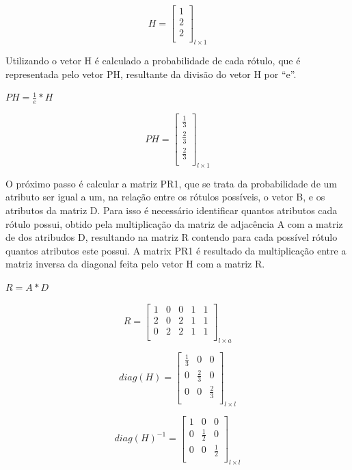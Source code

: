 $$H=\left[
\begin{array}{c}
1 \\
2 \\
2 \\
\end{array}
\right]_{l \times 1}$$

Utilizando o vetor H é calculado a probabilidade de cada rótulo, que é representada
pelo vetor PH, resultante da divisão do vetor H por ``e''.

\begin{center}
$PH= \frac{1}{e} * H$
\end{center}

$$PH=\left[
\begin{array}{c}
\frac{1}{3} \\
\frac{2}{3} \\
\frac{2}{3} \\
\end{array}
\right]_{l \times 1}$$

O próximo passo é calcular a matriz PR1, que se trata da probabilidade de um
atributo ser igual a um, na relação entre os rótulos possíveis, o vetor B, e os
atributos da matriz D. Para isso é necessário identificar quantos atributos cada
rótulo possui, obtido pela multiplicação da matriz de adjacência A com a matriz
de dos atribudos D, resultando na matriz R contendo para cada possível rótulo
quantos atributos este possui. A matrix PR1 é resultado da multiplicação entre a
matriz inversa da diagonal feita pelo vetor H com a matriz R.

\begin{center}
$R = A * D$
\end{center}

$$R=\left[
\begin{array}{ccccc}
1 & 0 & 0 & 1 & 1 \\
2 & 0 & 2 & 1 & 1 \\
0 & 2 & 2 & 1 & 1 \\
\end{array}
\right]_{l \times a}$$

$$diag(H)=\left[
\begin{array}{ccc}
\frac{1}{3} & 0 & 0 \\
0 & \frac{2}{3} & 0 \\
0 & 0 & \frac{2}{3} \\
\end{array}
\right]_{l \times l}$$

$$diag(H)^{-1}=\left[
\begin{array}{ccc}
1 & 0 & 0 \\
0 & \frac{1}{2} & 0 \\
0 & 0 & \frac{1}{2} \\
\end{array}
\right]_{l \times l}$$


